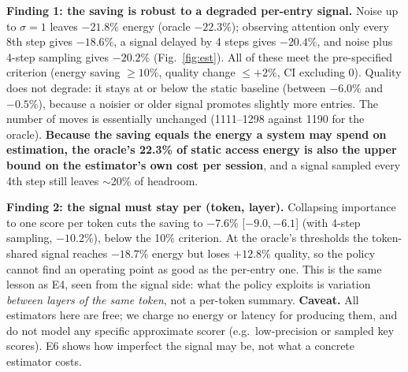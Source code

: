 \textbf{Finding 1: the saving is robust to a degraded per-entry signal.} Noise up to $\sigma{=}1$ leaves $-21.8\%$ energy (oracle $-22.3\%$); observing attention only every 8th step gives $-18.6\%$, a signal delayed by 4 steps gives $-20.4\%$, and noise plus 4-step sampling gives $-20.2\%$ (Fig.~\ref{fig:est}). All of these meet the pre-specified criterion (energy saving $\ge10\%$, quality change $\le+2\%$, CI excluding 0). Quality does not degrade: it stays at or below the static baseline (between $-6.0\%$ and $-0.5\%$), because a noisier or older signal promotes slightly more entries. The number of moves is essentially unchanged (1111--1298 against 1190 for the oracle). \textbf{Because the saving equals the energy a system may spend on estimation, the oracle's 22.3\% of static access energy is also the upper bound on the estimator's own cost per session}, and a signal sampled every 4th step still leaves $\sim$20\% of headroom.

\textbf{Finding 2: the signal must stay per (token, layer).} Collapsing importance to one score per token cuts the saving to $-7.6\%$ [$-9.0,-6.1$] (with 4-step sampling, $-10.2\%$), below the 10\% criterion. At the oracle's thresholds the token-shared signal reaches $-18.7\%$ energy but loses $+12.8\%$ quality, so the policy cannot find an operating point as good as the per-entry one. This is the same lesson as E4, seen from the signal side: what the policy exploits is variation \emph{between layers of the same token}, not a per-token summary. \textbf{Caveat.} All estimators here are free; we charge no energy or latency for producing them, and do not model any specific approximate scorer (e.g.\ low-precision or sampled key scores). E6 shows how imperfect the signal may be, not what a concrete estimator costs.
